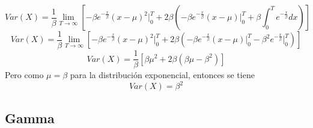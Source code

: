 \documentclass[12pt]{article}
\begin{document}
            \begin{equation*}
            	Var(X)=\frac{1}{\beta}\lim_{T \rightarrow \infty}\left[ -\beta e^{-\frac{x}{\beta}}(x-\mu )^{ 2 } \bigg|_0^T + 2\beta \left( -\beta e^{-\frac{x}{\beta}}(x-\mu )\bigg|_0^T +\beta\int_{0}^{T}{e^{-\frac{x}{\beta}}dx} \right)\right]
            \end{equation*}
            \begin{equation*}
            	Var(X)=\frac{1}{\beta}\lim_{T \rightarrow \infty}\left[ -\beta e^{-\frac{x}{\beta}}(x-\mu )^{ 2 } \bigg|_0^T + 2\beta \left( -\beta e^{-\frac{x}{\beta}}(x-\mu )\bigg|_0^T -\beta^2e^{-\frac{x}{\beta}}\bigg|_0^T  \right)\right]
            \end{equation*}
            \begin{equation*}
            	Var(X)=\frac{1}{\beta}\left[\beta\mu^2+2\beta\left( \beta\mu -\beta^2\right)\right]
            \end{equation*}
            Pero como $\mu = \beta$ para la distribución exponencial, entonces se tiene
            \begin{equation*}
            	Var(X)=\beta^2
            \end{equation*}
            
  		\subsection{Gamma}	
\end{document}
